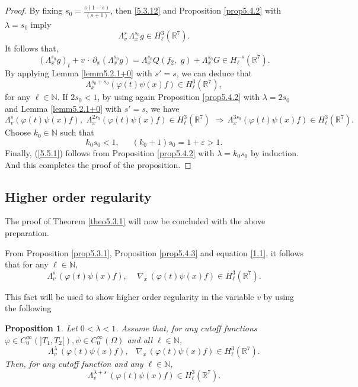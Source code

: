 \documentclass{amsart}[12pt, article]
\newtheorem{prop}[theo]{Proposition}
\begin{document}
\begin{proof}  By fixing $s_0=\frac{s(1-s)}{(s+1)}$, then
\eqref{5.3.12} and Proposition \ref{prop5.4.2} with $\lambda=s_0$
imply
$$
\Lambda^{s}_{v}\,\Lambda^{s_0}_{x} g\in H^{3}_\ell({{{\mathbb R}}}^7).
$$
It follows that,
\begin{equation*}\label{4.1+17}
 (\Lambda^{s_0}_{x} g)_t + v\,\cdot\,\partial_x {(\Lambda^{s_0}_{x} g)}
  =\Lambda^{s_0}_{x} Q(f_2,\,\, g)+ \Lambda^{s_0}_{x}  G\in
H^{-s}_\ell({{{\mathbb R}}}^7).
\end{equation*}
By applying Lemma \ref{lemm5.2.1+0} with $s'=s$, we can deduce that
\begin{equation*}
\Lambda^{s_0+s_0}_{x} (\varphi(t)\psi(x) f)\in H^3_\ell  ({{{\mathbb R}}}^7),
\end{equation*}
for any $\ell  \in{{\mathbb N}}$. If $2s_0<1$, by using again Proposition
\ref{prop5.4.2} with $\lambda=2s_0$ and Lemma \ref{lemm5.2.1+0} with
$s'=s$, we have
$$
\Lambda^{s}_{v} (\varphi(t)\psi(x) f),\,\,\Lambda^{2s_0}_{x}
(\varphi(t)\psi(x) f)\in H^3_\ell ({{{\mathbb R}}}^7)\,\,\Rightarrow\,
\Lambda^{3s_0}_{x} (\varphi(t)\psi(x) f)\in H^3_\ell ({{{\mathbb R}}}^7).
$$
Choose $k_0\in{{\mathbb N}}$ such that
$$
k_0 s_0<1,\,\,\,\,\,\,\,\,\, (k_0+1) s_0=1+\varepsilon>1.
$$
Finally, (\ref{5.5.1}) follows {}from Proposition \ref{prop5.4.2} with
$\lambda=k_0s_0$ by induction. And
this completes the proof of the proposition.
\end{proof}

\subsection{Higher order regularity}\label{section6.4}
\setcounter{equation}{0}
\smallskip
The proof of Theorem \ref{theo5.3.1} will now be concluded with
the above preparation.

{}From Proposition \ref{prop5.3.1},
Proposition \ref{prop5.4.3} and equation \eqref{1.1}, it follows
that for any $\ell\in{{\mathbb N}}$,
\begin{equation*}
\Lambda^{s}_{v}\, (\varphi(t)\psi(x) f),\,\,\,\,\,\,\, \nabla_{x} \,
(\varphi(t)\psi(x) f) \in H^3_\ell({{{\mathbb R}}}^7).
\end{equation*}

This fact will be used to show higher order regularity in
the variable $v$ by using the following

\begin{prop}\label{prop6.5.1}
Let $0<\lambda< 1$. Assume that, for any cutoff functions
$\varphi\in C^\infty_0(]T_1, T_2[), \psi\in C^\infty_0(\Omega)$ and
all $\ell\in{{\mathbb N}}$,
\begin{equation*}
\Lambda^{\lambda}_{v}\, (\varphi(t)\psi(x) f),\,\,\,\,\,
\nabla_{x}\, (\varphi(t)\psi(x) f) \in H^3_\ell  ({{{\mathbb R}}}^7).
\end{equation*}
Then, for any cutoff function and any $\ell\in{{\mathbb N}}$,
\begin{equation*}
\Lambda^{\lambda+s}_v\, (\varphi(t)\psi(x) f)\in H^3_\ell({{{\mathbb R}}}^7).
\end{equation*}
\end{prop}
\end{document}
